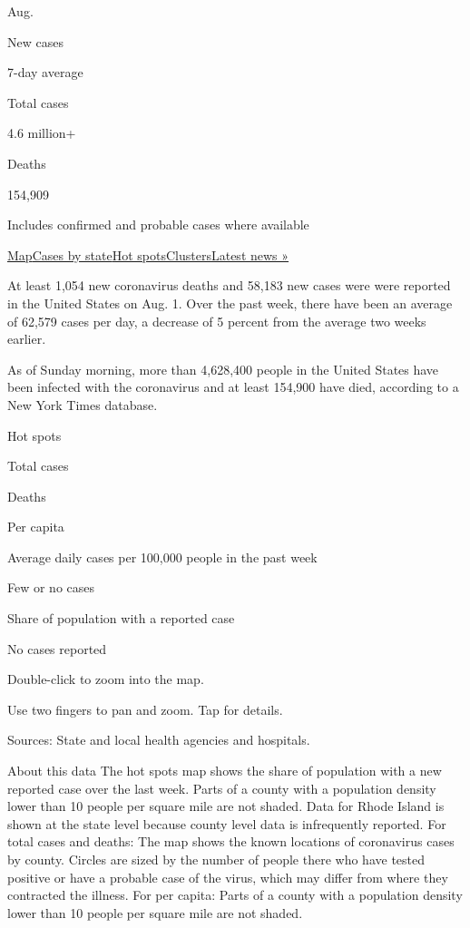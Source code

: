 Aug.

New cases

7-day average

Total cases

4.6 million+

Deaths

154,909

Includes confirmed and probable cases where available

\protect\hyperlink{map}{Map}\protect\hyperlink{states}{Cases by
state}\protect\hyperlink{hotspots}{Hot
spots}\protect\hyperlink{clusters}{Clusters}\href{https://www.nytimes.com/2020/08/01/world/coronavirus-covid-19.html}{Latest
news »}

At least 1,054 new coronavirus deaths and 58,183 new cases were were
reported in the United States on Aug. 1. Over the past week, there have
been an average of 62,579 cases per day, a decrease of 5 percent from
the average two weeks earlier.

As of Sunday morning, more than 4,628,400 people in the United States
have been infected with the coronavirus and at least 154,900 have died,
according to a New York Times database.

Hot spots

Total cases

Deaths

Per capita

Average daily cases per 100,000 people in the past week

Few or no cases

Share of population with a reported case

No cases reported

Double-click to zoom into the map.

Use two fingers to pan and zoom. Tap for details.

Sources: State and local health agencies and hospitals.

About this data The hot spots map shows the share of population with a
new reported case over the last week. Parts of a county with a
population density lower than 10 people per square mile are not shaded.
Data for Rhode Island is shown at the state level because county level
data is infrequently reported. For total cases and deaths: The map shows
the known locations of coronavirus cases by county. Circles are sized by
the number of people there who have tested positive or have a probable
case of the virus, which may differ from where they contracted the
illness. For per capita: Parts of a county with a population density
lower than 10 people per square mile are not shaded.

